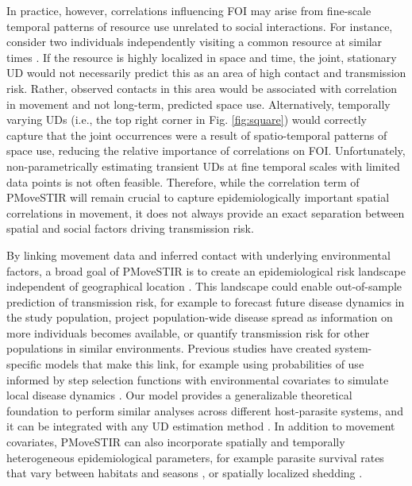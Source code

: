 \documentclass[letterpaper]{article}
\begin{document}
In practice, however, correlations influencing FOI may arise from fine-scale temporal patterns of resource use unrelated to social interactions. For instance, consider two individuals independently visiting a common resource at similar times \citep[e.g., a watering hole,][]{VanderWaal2017}. If the resource is highly localized in space and time, the joint, stationary UD would not necessarily predict this as an area of high contact and transmission risk. Rather, observed contacts in this area would be associated with correlation in movement and not long-term, predicted space use.
Alternatively, temporally varying UDs (i.e., the top right corner in Fig. \ref{fig:square}) would correctly capture that the joint occurrences were a result of spatio-temporal patterns of space use, reducing the relative importance of correlations on FOI. Unfortunately, non-parametrically estimating transient UDs at fine temporal scales with limited data points is not often feasible. Therefore, while the correlation term of PMoveSTIR will remain crucial to capture epidemiologically important spatial correlations in movement, it does not always provide an exact separation between spatial and social factors driving transmission risk.

By linking movement data and inferred contact with underlying environmental factors, a broad goal of PMoveSTIR is to create an epidemiological risk landscape independent of geographical location \citep{Manlove2022}. This landscape could enable out-of-sample prediction of transmission risk, for example to forecast future disease dynamics in the study population, project population-wide disease spread as information on more individuals becomes available, or quantify transmission risk for other populations in similar environments. Previous studies have created system-specific models that make this link, for example using probabilities of use informed by step selection functions with environmental covariates to simulate local disease dynamics \citep{Merkle2018}. Our model provides a generalizable theoretical foundation to perform similar analyses across different host-parasite systems, and it can be integrated with any UD estimation method \citep{Signer2017,Merkle2018,Michelot2020,Potts2023}. In addition to movement covariates, PMoveSTIR can also incorporate spatially and temporally heterogeneous epidemiological parameters, for example parasite survival rates that vary between habitats and seasons \citep{Daversa2017}, or spatially localized shedding \citep{Weinstein2018a}. 
\end{document}
